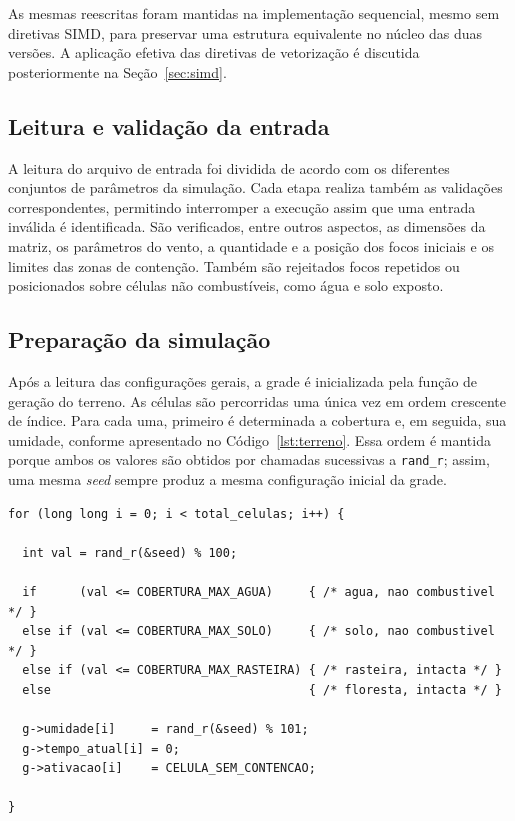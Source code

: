 \documentclass[11pt,a4paper]{article}
\begin{document}
As mesmas reescritas foram mantidas na implementação sequencial, mesmo sem diretivas SIMD, para preservar uma estrutura equivalente no núcleo das duas versões. A aplicação efetiva das diretivas de vetorização é discutida posteriormente na Seção~\ref{sec:simd}.

\subsection{Leitura e validação da entrada}

A leitura do arquivo de entrada foi dividida de acordo com os diferentes conjuntos de parâmetros da simulação. Cada etapa realiza também as validações correspondentes, permitindo interromper a execução assim que uma entrada inválida é identificada. São verificados, entre outros aspectos, as dimensões da matriz, os parâmetros do vento, a quantidade e a posição dos focos iniciais e os limites das zonas de contenção. Também são rejeitados focos repetidos ou posicionados sobre células não combustíveis, como água e solo exposto.

\subsection{Preparação da simulação}
\label{sec:preparacao}

Após a leitura das configurações gerais, a grade é inicializada pela função de geração do terreno. As células são percorridas uma única vez em ordem crescente de índice. Para cada uma, primeiro é determinada a cobertura e, em seguida, sua umidade, conforme apresentado no Código~\ref{lst:terreno}. Essa ordem é mantida porque ambos os valores são obtidos por chamadas sucessivas a \texttt{rand\_r}; assim, uma mesma \emph{seed} sempre produz a mesma configuração inicial da grade.

\begin{lstlisting}[caption={Geração do terreno e da umidade, idêntica nas duas versões.},label={lst:terreno}]
for (long long i = 0; i < total_celulas; i++) {

  int val = rand_r(&seed) % 100;

  if      (val <= COBERTURA_MAX_AGUA)     { /* agua, nao combustivel */ }
  else if (val <= COBERTURA_MAX_SOLO)     { /* solo, nao combustivel */ }
  else if (val <= COBERTURA_MAX_RASTEIRA) { /* rasteira, intacta */ }
  else                                    { /* floresta, intacta */ }

  g->umidade[i]     = rand_r(&seed) % 101;
  g->tempo_atual[i] = 0;
  g->ativacao[i]    = CELULA_SEM_CONTENCAO;

}
\end{lstlisting}
\end{document}
